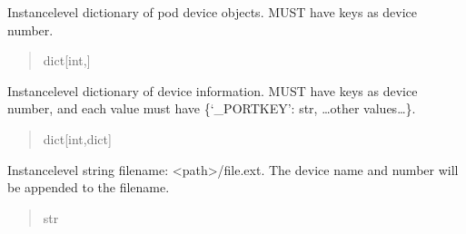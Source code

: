 \documentclass[letterpaper,10pt,english]{sphinxmanual}
\begin{document}
\begin{fulllineitems}

\begin{fulllineitems}
\label{\detokenize{Setup_PodInterface:Setup_PodInterface.Setup_Interface._podDevices}}
\pysigstartsignatures
{}
\pysigstopsignatures
\sphinxAtStartPar
Instance\sphinxhyphen{}level dictionary of pod device objects. MUST have             keys as device number.
\begin{quote}\begin{description}
\sphinxAtStartPar
dict{[}int,{\hyperref[\detokenize{BasicPodProtocol:BasicPodProtocol.POD_Basics}]{}}{]}

\end{description}\end{quote}

\end{fulllineitems}


\begin{fulllineitems}
\label{\detokenize{Setup_PodInterface:Setup_PodInterface.Setup_Interface._podParametersDict}}
\pysigstartsignatures
{}
\pysigstopsignatures
\sphinxAtStartPar
Instance\sphinxhyphen{}level dictionary of device information. MUST have             keys as device number, and each value must have \{‘\_PORTKEY’: str, …other values…\}.
\begin{quote}\begin{description}
\sphinxAtStartPar
dict{[}int,dict{]}

\end{description}\end{quote}

\end{fulllineitems}


\begin{fulllineitems}
\label{\detokenize{Setup_PodInterface:Setup_PodInterface.Setup_Interface._saveFileName}}
\pysigstartsignatures
{}
\pysigstopsignatures
\sphinxAtStartPar
Instance\sphinxhyphen{}level string filename: \textless{}path\textgreater{}/file.ext. The device name and number             will be appended to the filename.
\begin{quote}\begin{description}
\sphinxAtStartPar
str


\end{description}
\end{quote}
\end{fulllineitems}
\end{fulllineitems}
\end{document}
